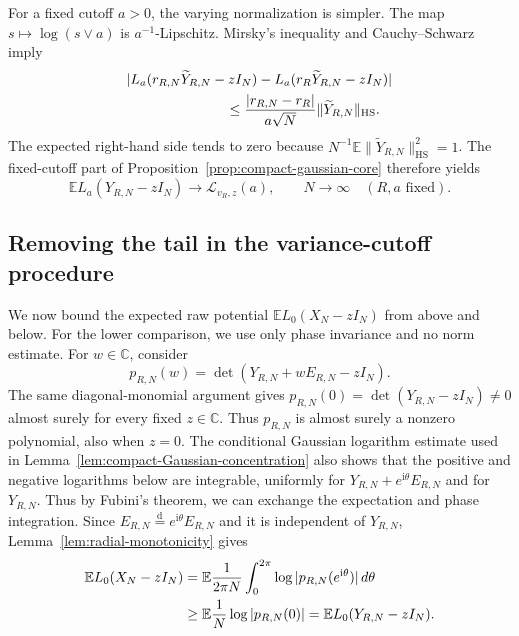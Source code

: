 \documentclass[11pt,reqno]{amsart}
\numberwithin{equation}{section}
\theoremstyle{definition}
\theoremstyle{remark}
\newcommand{\C}{\mathbb C}
\newcommand{\E}{\mathbb E}
\newcommand{\1}{\mathbf 1}
\newcommand{\HS}{\mathrm{HS}}
\begin{document}
For a fixed cutoff $a>0$, the varying normalization is simpler.  The map
$s\mapsto\log(s\vee a)$ is $a^{-1}$-Lipschitz.  Mirsky's inequality and
Cauchy--Schwarz imply
\begin{align}
 &|L_a(r_{R,N}\widetilde Y_{R,N}-zI_N)
 -L_a(r_R\widetilde Y_{R,N}-zI_N)| \notag\\
 &\hspace{25mm}\le
 \frac{|r_{R,N}-r_R|}{a\sqrt N}\|\widetilde Y_{R,N}\|_{\HS}.
 \label{eq:varying-normalization-La}
\end{align}
The expected right-hand side tends to zero because
$N^{-1}\E\|\widetilde Y_{R,N}\|_{\HS}^2=1$.  The fixed-cutoff part of
Proposition~\ref{prop:compact-gaussian-core} therefore yields
\begin{equation}\label{eq:core-cut-limit}
 \E L_a(Y_{R,N}-zI_N)\longrightarrow\mathcal L_{v_R,z}(a),
 \qquad N\to\infty
 \quad(R,a\text{ fixed}).
\end{equation}

\subsection{Removing the tail in the variance-cutoff procedure}
We now bound the expected raw potential
\(\E L_0(X_N-zI_N)\) from above and below.
For the lower comparison, we use only phase invariance and no norm
estimate.  For \(w\in\C\), consider
\[
p_{R,N}(w)=\det(Y_{R,N}+wE_{R,N}-zI_N).
\]
The same diagonal-monomial argument gives
\(p_{R,N}(0)=\det(Y_{R,N}-zI_N)\ne0\) almost surely for every fixed
\(z\in\C\).  Thus \(p_{R,N}\) is almost surely a nonzero polynomial,
also when \(z=0\).
The conditional Gaussian logarithm estimate used in
Lemma~\ref{lem:compact-Gaussian-concentration} also shows that the positive
and negative logarithms below are integrable, uniformly for
$Y_{R,N}+e^{\mathrm i\theta}E_{R,N}$ and for $Y_{R,N}$.  Thus by Fubini's
theorem, we can exchange the expectation and phase integration.
Since
\(E_{R,N}\stackrel{\mathrm d}=e^{\mathrm i\theta}E_{R,N}\) and it is
independent of \(Y_{R,N}\),
Lemma~\ref{lem:radial-monotonicity} gives
\begin{align}
 \E L_0(X_N-zI_N)
 &=\E\frac1{2\pi N}\int_0^{2\pi}
 \log|p_{R,N}(e^{\mathrm i\theta})|\,d\theta \notag\\
 &\ge \E\frac1N\log|p_{R,N}(0)|
 =\E L_0(Y_{R,N}-zI_N).
 \label{eq:tail-Jensen-lower}
\end{align}
\end{document}

